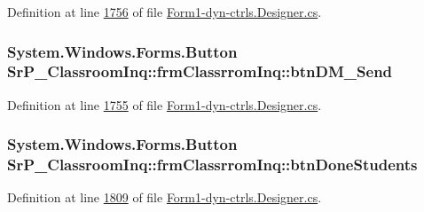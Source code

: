 \-Definition at line \hyperlink{_form1-dyn-ctrls_8_designer_8cs_source_l01756}{1756} of file \hyperlink{_form1-dyn-ctrls_8_designer_8cs_source}{\-Form1-\/dyn-\/ctrls.\-Designer.\-cs}.

\hypertarget{class_sr_p___classroom_inq_1_1frm_classrrom_inq_a5633d72d43c108b34eb912acdcc81878}{
\subsubsection[{btn\-D\-M\-\_\-\-Send}]{\setlength{\rightskip}{0pt plus 5cm}\-System.\-Windows.\-Forms.\-Button {\bf \-Sr\-P\-\_\-\-Classroom\-Inq\-::frm\-Classrrom\-Inq\-::btn\-D\-M\-\_\-\-Send}}}
\label{class_sr_p___classroom_inq_1_1frm_classrrom_inq_a5633d72d43c108b34eb912acdcc81878}


\-Definition at line \hyperlink{_form1-dyn-ctrls_8_designer_8cs_source_l01755}{1755} of file \hyperlink{_form1-dyn-ctrls_8_designer_8cs_source}{\-Form1-\/dyn-\/ctrls.\-Designer.\-cs}.

\hypertarget{class_sr_p___classroom_inq_1_1frm_classrrom_inq_a9225d189a561ae3a5b9f68ca3c004351}{
\subsubsection[{btn\-Done\-Students}]{\setlength{\rightskip}{0pt plus 5cm}\-System.\-Windows.\-Forms.\-Button {\bf \-Sr\-P\-\_\-\-Classroom\-Inq\-::frm\-Classrrom\-Inq\-::btn\-Done\-Students}}}
\label{class_sr_p___classroom_inq_1_1frm_classrrom_inq_a9225d189a561ae3a5b9f68ca3c004351}


\-Definition at line \hyperlink{_form1-dyn-ctrls_8_designer_8cs_source_l01809}{1809} of file \hyperlink{_form1-dyn-ctrls_8_designer_8cs_source}{\-Form1-\/dyn-\/ctrls.\-Designer.\-cs}.

